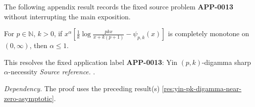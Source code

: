 The following appendix result records the fixed source problem \textbf{APP-0013} \cite{yin-pk-digamma} without interrupting the main exposition.
\begin{corollary}
\label{res:yin-pk-digamma-alpha-necessity}
For \(p\in\mathbb N\), \(k>0\), if \(x^\alpha\left[\frac1k\log\frac{pkx}{x+k(p+1)}-\psi_{p,k}(x)\right]\) is completely monotone on \((0,\infty)\), then \(\alpha\le1\).

This resolves the fixed application label \textbf{APP-0013}: Yin \((p,k)\)-digamma sharp \(\alpha\)-necessity
\emph{Source reference.} \cite{yin-pk-digamma}.

\emph{Dependency.} The proof uses the preceding result(s) \ref{res:yin-pk-digamma-near-zero-asymptotic}.
\end{corollary}
